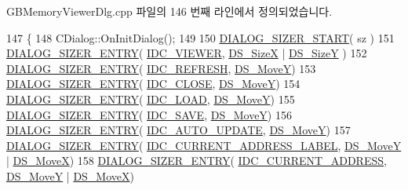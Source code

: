 G\+B\+Memory\+Viewer\+Dlg.\+cpp 파일의 146 번째 라인에서 정의되었습니다.


\begin{DoxyCode}
147 \{
148   CDialog::OnInitDialog();
149   
150   \mbox{\hyperlink{_resize_dlg_8h_acb9d1d22d9838f6dda8a61cfa132997c}{DIALOG\_SIZER\_START}}( sz )
151     \mbox{\hyperlink{_resize_dlg_8h_a0e9ee7a18c54003893895a009f5d79c8}{DIALOG\_SIZER\_ENTRY}}( \mbox{\hyperlink{resource_8h_a183e37b5faddaacf9f89ffbaf9eac751}{IDC\_VIEWER}}, \mbox{\hyperlink{_resize_dlg_8h_a21713fd373c62604a1ee3d5d831101ad}{DS\_SizeX}} | 
      \mbox{\hyperlink{_resize_dlg_8h_a783821ba6bb984916d55f46cdf90cb2b}{DS\_SizeY}} )
152     \mbox{\hyperlink{_resize_dlg_8h_a0e9ee7a18c54003893895a009f5d79c8}{DIALOG\_SIZER\_ENTRY}}( \mbox{\hyperlink{resource_8h_ab2f366ad34063a7be9de1e2249dc705a}{IDC\_REFRESH}}, \mbox{\hyperlink{_resize_dlg_8h_ae5309071be822a4dae5cb33a131f6180}{DS\_MoveY}})
153     \mbox{\hyperlink{_resize_dlg_8h_a0e9ee7a18c54003893895a009f5d79c8}{DIALOG\_SIZER\_ENTRY}}( \mbox{\hyperlink{resource_8h_a27e7224faecfa4040c695a69107088f9}{IDC\_CLOSE}}, \mbox{\hyperlink{_resize_dlg_8h_ae5309071be822a4dae5cb33a131f6180}{DS\_MoveY}})
154     \mbox{\hyperlink{_resize_dlg_8h_a0e9ee7a18c54003893895a009f5d79c8}{DIALOG\_SIZER\_ENTRY}}( \mbox{\hyperlink{resource_8h_a00b5a792c57cb3a7893f04ddd3944073}{IDC\_LOAD}}, \mbox{\hyperlink{_resize_dlg_8h_ae5309071be822a4dae5cb33a131f6180}{DS\_MoveY}})
155     \mbox{\hyperlink{_resize_dlg_8h_a0e9ee7a18c54003893895a009f5d79c8}{DIALOG\_SIZER\_ENTRY}}( \mbox{\hyperlink{resource_8h_a305f8d6fb810f32b99a97396ac92f9d5}{IDC\_SAVE}}, \mbox{\hyperlink{_resize_dlg_8h_ae5309071be822a4dae5cb33a131f6180}{DS\_MoveY}})
156     \mbox{\hyperlink{_resize_dlg_8h_a0e9ee7a18c54003893895a009f5d79c8}{DIALOG\_SIZER\_ENTRY}}( \mbox{\hyperlink{resource_8h_ad369b05206010ebec1c8a69a1dd1f141}{IDC\_AUTO\_UPDATE}}, 
      \mbox{\hyperlink{_resize_dlg_8h_ae5309071be822a4dae5cb33a131f6180}{DS\_MoveY}})
157     \mbox{\hyperlink{_resize_dlg_8h_a0e9ee7a18c54003893895a009f5d79c8}{DIALOG\_SIZER\_ENTRY}}( \mbox{\hyperlink{resource_8h_ac165826c6eedc5689757deea0b53b161}{IDC\_CURRENT\_ADDRESS\_LABEL}}, 
      \mbox{\hyperlink{_resize_dlg_8h_ae5309071be822a4dae5cb33a131f6180}{DS\_MoveY}} | \mbox{\hyperlink{_resize_dlg_8h_a9f96d817606755d91347bd606825c5af}{DS\_MoveX}})
158     \mbox{\hyperlink{_resize_dlg_8h_a0e9ee7a18c54003893895a009f5d79c8}{DIALOG\_SIZER\_ENTRY}}( \mbox{\hyperlink{resource_8h_a276d745c58339acb548a3b1d2f2ce3fb}{IDC\_CURRENT\_ADDRESS}}, 
      \mbox{\hyperlink{_resize_dlg_8h_ae5309071be822a4dae5cb33a131f6180}{DS\_MoveY}} | \mbox{\hyperlink{_resize_dlg_8h_a9f96d817606755d91347bd606825c5af}{DS\_MoveX}})

\end{DoxyCode}
